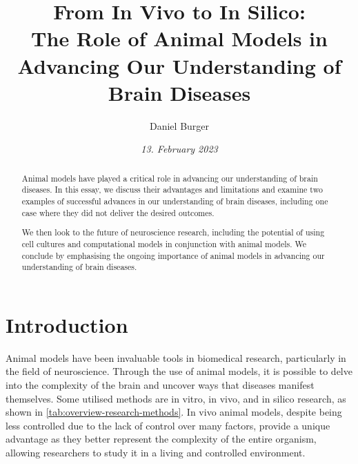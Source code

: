 \documentclass[10pt]{article}
\title{\textbf{From In Vivo to In Silico:} \\ The Role of Animal Models in Advancing Our Understanding of Brain Diseases}
\author[ ]{Daniel Burger}
\affil[ ]{\textbf{King’s College London}}
\affil[ ]{\href{mailto:public@danielburger.online}{public@danielburger.online}}
\date{\textit{13. February 2023}}
\begin{document}

\maketitle
\thispagestyle{empty}

\begin{sloppypar} %
  \begin{abstract}
    Animal models have played a critical role in advancing our understanding of brain diseases. In this essay, we discuss their advantages and limitations and examine two examples of successful advances in our understanding of brain diseases, including one case where they did not deliver the desired outcomes.

    We then look to the future of neuroscience research, including the potential of using cell cultures and computational models in conjunction with animal models. We conclude by emphasising the ongoing importance of animal models in advancing our understanding of brain diseases.

  \end{abstract}
  \pagebreak

  \tableofcontents
  \pagebreak

  \listoffigures
  \pagebreak

  \listoftables
  \pagebreak


  \doublespacing

  \section{Introduction}
  \label{sec:introduction}

  Animal models have been invaluable tools in biomedical research, particularly in the field of neuroscience. Through the use of animal models, it is possible to delve into the complexity of the brain and uncover ways that diseases manifest themselves. Some utilised methods are in vitro, in vivo, and in silico research, as shown in \autoref{tab:overview-research-methods}. In vivo animal models, despite being less controlled due to the lack of control over many factors, provide a unique advantage as they better represent the complexity of the entire organism, allowing researchers to study it in a living and controlled environment.


\end{sloppypar}
\end{document}
